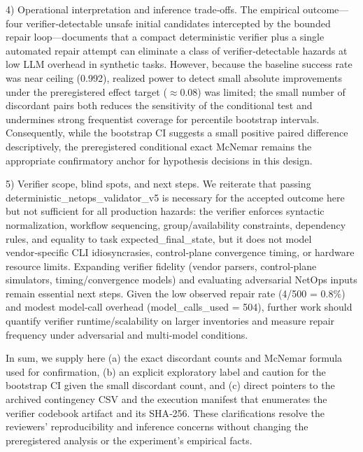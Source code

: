 \documentclass[conference]{IEEEtran}
\begin{document}
4) Operational interpretation and inference trade‑offs. The empirical outcome---four verifier‑detectable unsafe initial candidates intercepted by the bounded repair loop---documents that a compact deterministic verifier plus a single automated repair attempt can eliminate a class of verifier‑detectable hazards at low LLM overhead in synthetic tasks. However, because the baseline success rate was near ceiling (0.992), realized power to detect small absolute improvements under the preregistered effect target (\ensuremath{\approx}0.08) was limited; the small number of discordant pairs both reduces the sensitivity of the conditional test and undermines strong frequentist coverage for percentile bootstrap intervals. Consequently, while the bootstrap CI suggests a small positive paired difference descriptively, the preregistered conditional exact McNemar remains the appropriate confirmatory anchor for hypothesis decisions in this design.

5) Verifier scope, blind spots, and next steps. We reiterate that passing deterministic\_netops\_validator\_v5 is necessary for the accepted outcome here but not sufficient for all production hazards: the verifier enforces syntactic normalization, workflow sequencing, group/availability constraints, dependency rules, and equality to task expected\_final\_state, but it does not model vendor‑specific CLI idiosyncrasies, control‑plane convergence timing, or hardware resource limits. Expanding verifier fidelity (vendor parsers, control‑plane simulators, timing/convergence models) and evaluating adversarial NetOps inputs remain essential next steps. Given the low observed repair rate (4/500 = 0.8\%) and modest model‑call overhead (model\_calls\_used = 504), further work should quantify verifier runtime/scalability on larger inventories and measure repair frequency under adversarial and multi‑model conditions.

In sum, we supply here (a) the exact discordant counts and McNemar formula used for confirmation, (b) an explicit exploratory label and caution for the bootstrap CI given the small discordant count, and (c) direct pointers to the archived contingency CSV and the execution manifest that enumerates the verifier codebook artifact and its SHA‑256. These clarifications resolve the reviewers' reproducibility and inference concerns without changing the preregistered analysis or the experiment's empirical facts.
\end{document}
